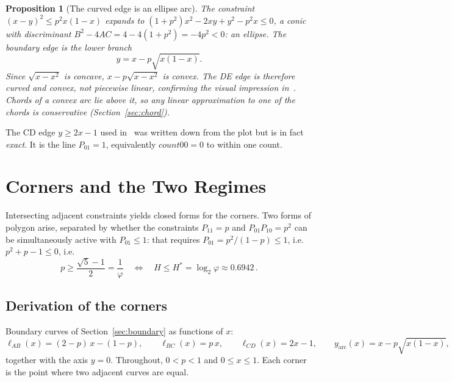 \documentclass[11pt]{article}
\newtheorem{proposition}{Proposition}
\begin{document}
\begin{proposition}[The curved edge is an ellipse arc]
The constraint $(x-y)^2 \le p^2 x(1-x)$ expands to
$(1+p^2)x^2 - 2xy + y^2 - p^2 x \le 0$, a conic with discriminant
$B^2-4AC = 4-4(1+p^2) = -4p^2 < 0$: an ellipse. The boundary edge is the
lower branch
\begin{equation}
y = x - p\sqrt{x(1-x)}.
\label{eq:arc}
\end{equation}
Since $\sqrt{x-x^2}$ is concave, $x - p\sqrt{x-x^2}$ is convex. The DE edge
is therefore curved and convex, not piecewise linear, confirming
the visual impression in~\cite{johnston2024}. Chords of a convex arc lie above it,
so any linear approximation to one of the chords is conservative
(Section~\ref{sec:chord}).
\end{proposition}

The CD edge $y \ge 2x-1$ used in~\cite{johnston2024} was written
down from the plot but is in fact \emph{exact}. It is the line
$P_{01}=1$, equivalently $\mathit{count00}=0$ to within one count.

\section{Corners and the Two Regimes}
\label{sec:corners}

Intersecting adjacent constraints yields closed forms for the corners. Two
forms of polygon arise, separated by whether the constraints $P_{11}=p$ and
$P_{01}P_{10}=p^2$ can be simultaneously active with $P_{01}\le 1$: that
requires $P_{01}=p^2/(1-p)\le 1$, i.e.\ $p^2+p-1\le 0$, i.e.
\begin{equation}
p \ge \frac{\sqrt5 - 1}{2} = \frac{1}{\varphi}
\quad\Longleftrightarrow\quad
H \le H^\ast = \log_2\varphi \approx 0.6942\,.
\end{equation}

\subsection{Derivation of the corners}
\label{sec:cornerderiv}
Boundary curves of Section~\ref{sec:boundary} as functions of $x$:
\[
\ell_{AB}(x) = (2-p)\,x-(1-p),\qquad
\ell_{BC}(x) = p\,x,\qquad
\ell_{CD}(x) = 2x-1,\qquad
y_{\mathrm{arc}}(x) = x-p\sqrt{x(1-x)},
\]
together with the axis $y=0$. Throughout, $0<p<1$ and $0\le x\le 1$. Each
corner is the point where two adjacent curves are equal.
\end{document}
